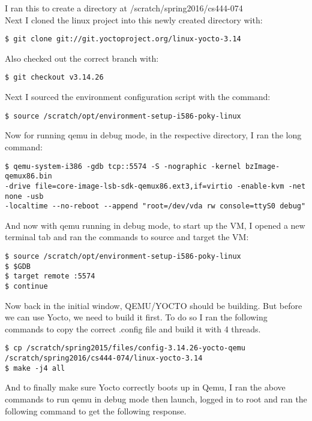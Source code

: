 \documentclass[letterpaper,10pt,titlepage]{article}
\begin{document}
I ran this to create a directory at /scratch/spring2016/cs444-074\\

Next I cloned the linux project into this newly created directory with:

\begin{lstlisting}
$ git clone git://git.yoctoproject.org/linux-yocto-3.14
\end{lstlisting}

Also checked out the correct branch with:

\begin{lstlisting}
$ git checkout v3.14.26
\end{lstlisting}


Next I sourced the environment configuration script with the command:

\begin{lstlisting}
$ source /scratch/opt/environment-setup-i586-poky-linux
\end{lstlisting}

Now for running qemu in debug mode, in the respective directory, I ran the long command:

\begin{lstlisting}
$ qemu-system-i386 -gdb tcp::5574 -S -nographic -kernel bzImage-qemux86.bin
-drive file=core-image-lsb-sdk-qemux86.ext3,if=virtio -enable-kvm -net none -usb
-localtime --no-reboot --append "root=/dev/vda rw console=ttyS0 debug"
\end{lstlisting}

And now with qemu running in debug mode, to start up the VM, I opened a new terminal tab and ran the commands to source and target the VM:
\begin{lstlisting}
$ source /scratch/opt/environment-setup-i586-poky-linux
$ $GDB
$ target remote :5574
$ continue
\end{lstlisting}

Now back in the initial window, QEMU/YOCTO should be building. But before we can use Yocto, we need to build it first.  To do so I ran the following commands to copy the correct .config file and build it with 4 threads.

\begin{lstlisting}
$ cp /scratch/spring2015/files/config-3.14.26-yocto-qemu
/scratch/spring2016/cs444-074/linux-yocto-3.14
$ make -j4 all
\end{lstlisting}

And to finally make sure Yocto correctly boots up in Qemu, I ran the above commands to run qemu in debug mode then launch, logged in to root and ran the following command to get the following response.
\end{document}
